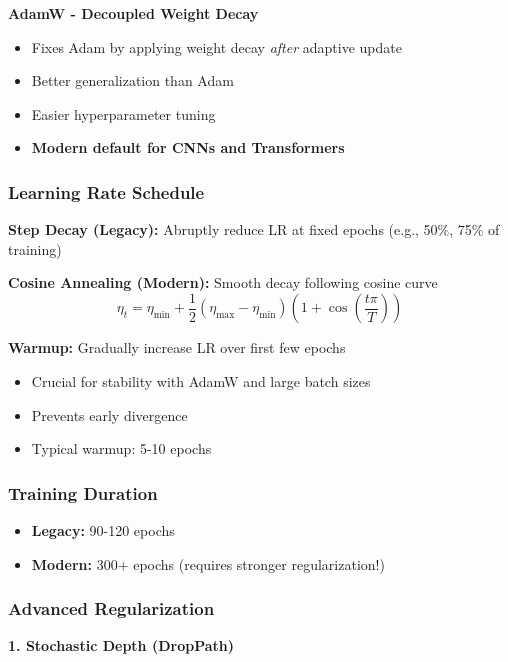 \documentclass{article}
\begin{document}
\textbf{AdamW - Decoupled Weight Decay}
\begin{itemize}
    \item Fixes Adam by applying weight decay \textit{after} adaptive update
    \item Better generalization than Adam
    \item Easier hyperparameter tuning
    \item \textbf{Modern default for CNNs and Transformers}
\end{itemize}

\subsubsection{Learning Rate Schedule}

\textbf{Step Decay (Legacy):} Abruptly reduce LR at fixed epochs (e.g., 50\%, 75\% of training)

\textbf{Cosine Annealing (Modern):} Smooth decay following cosine curve
\begin{equation}
\eta_t = \eta_{\min} + \frac{1}{2}(\eta_{\max} - \eta_{\min})\left(1 + \cos\left(\frac{t\pi}{T}\right)\right)
\end{equation}

\textbf{Warmup:} Gradually increase LR over first few epochs
\begin{itemize}
    \item Crucial for stability with AdamW and large batch sizes
    \item Prevents early divergence
    \item Typical warmup: 5-10 epochs
\end{itemize}

\subsubsection{Training Duration}

\begin{itemize}
    \item \textbf{Legacy:} 90-120 epochs
    \item \textbf{Modern:} 300+ epochs (requires stronger regularization!)
\end{itemize}

\subsubsection{Advanced Regularization}

\textbf{1. Stochastic Depth (DropPath)}
\end{document}
